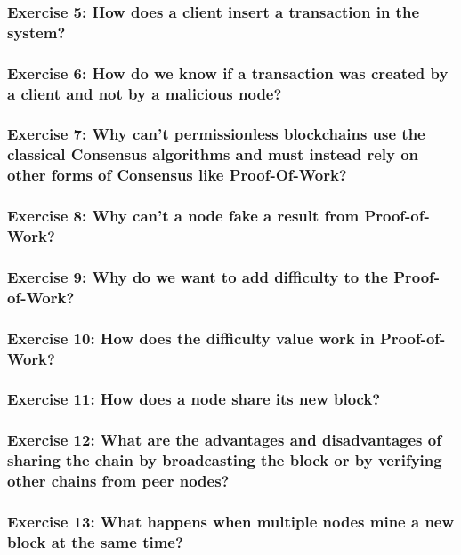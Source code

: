 \documentclass[12pt,a4paper]{article}
\theoremstyle{definition}
\begin{document}
\subsubsection*{Exercise 5: How does a client insert a transaction in the system?
}

\subsubsection*{Exercise 6: How do we know if a transaction was created by a client and not by a malicious node?}


\subsubsection*{Exercise 7: Why can't permissionless blockchains use the classical Consensus algorithms and must instead rely on other forms of Consensus like Proof-Of-Work?}

\subsubsection*{Exercise 8: Why can't a node fake a result from Proof-of-Work?}

\subsubsection*{Exercise 9: Why do we want to add difficulty to the Proof-of-Work?}

\subsubsection*{Exercise 10: How does the difficulty value work in Proof-of-Work?}


\subsubsection*{Exercise 11: How does a node share its new block?}

\subsubsection*{Exercise 12: What are the advantages and disadvantages of sharing the chain by broadcasting the block or by verifying other chains from peer nodes?}

\subsubsection*{Exercise 13: What happens when multiple nodes mine a new block at the same time?}
\end{document}
